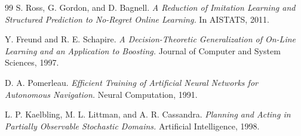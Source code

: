 \documentclass[11pt]{article}
\begin{document}
\begin{thebibliography}{99}
S. Ross, G. Gordon, and D. Bagnell.
\textit{A Reduction of Imitation Learning and Structured Prediction to No-Regret Online Learning.}
In AISTATS, 2011.

Y. Freund and R. E. Schapire.
\textit{A Decision-Theoretic Generalization of On-Line Learning and an Application to Boosting.}
Journal of Computer and System Sciences, 1997.

D. A. Pomerleau.
\textit{Efficient Training of Artificial Neural Networks for Autonomous Navigation.}
Neural Computation, 1991.

L. P. Kaelbling, M. L. Littman, and A. R. Cassandra.
\textit{Planning and Acting in Partially Observable Stochastic Domains.}
Artificial Intelligence, 1998.

\end{thebibliography}
\end{document}
